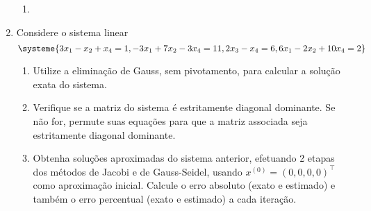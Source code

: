 \documentclass[12pt,a4paper]{article}
\begin{document}
\begin{enumerate}
\begin{multicols}{2}
\begin{enumerate}
\item {}
\end{enumerate}
\end{multicols}
\item Considere o sistema linear
\[
\systeme{
 3x_1 - x_2       + x_4 = 1,
-3x_1 +7x_2       -3x_4 = 11,
            2 x_3 - x_4 = 6,
 6x_1 -2x_2      +10x_4 = 2
}
\]
\begin{enumerate}
\item Utilize a eliminação de Gauss, sem pivotamento, para calcular a solução exata do sistema.
\item Verifique se a matriz do sistema é estritamente diagonal dominante. Se não for, permute suas equações para que a matriz associada seja estritamente diagonal dominante.
\item Obtenha soluções aproximadas do sistema anterior, efetuando 2 etapas dos métodos de Jacobi e de Gauss-Seidel, usando $x^{(0)} = (0, 0, 0, 0)^\intercal$ como aproximação inicial. Calcule o erro absoluto (exato e estimado) e também o erro percentual (exato e estimado) a cada iteração.
\end{enumerate}


\end{enumerate}
\end{document}
